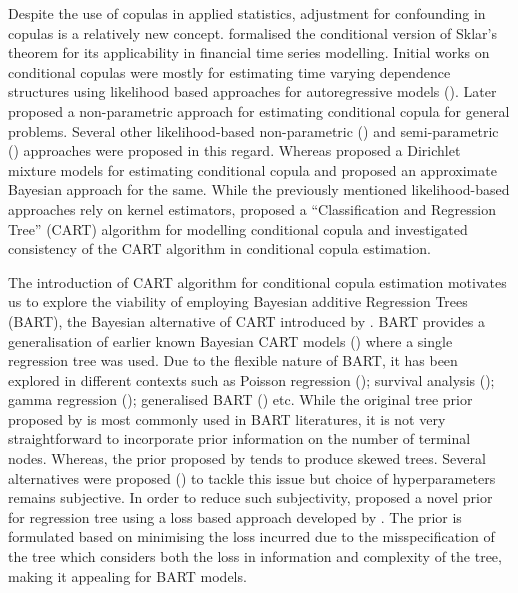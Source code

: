 \documentclass{amsart}
\begin{document}
Despite the use of copulas in applied statistics, adjustment for confounding in copulas is a relatively new concept. \citet{patton2006} formalised the conditional version of Sklar's theorem for its applicability in financial time series modelling. Initial works on conditional copulas were mostly for estimating time varying dependence structures using likelihood based approaches for autoregressive models (\citet{patton2006,JONDEAU2006827,BARTRAM20071461}). Later \citet{acar2010} proposed a non-parametric approach for estimating conditional copula for general problems. Several other likelihood-based non-parametric (\citet{GIJBELS20111919,Gijbels2012mult_cop}) and semi-parametric (\citet{ABEGAZ201243}) approaches were proposed in this regard. Whereas \citet{valle_cond_cop} proposed a Dirichlet mixture models for estimating conditional copula and \citet{GRAZIAN2022107417} proposed an approximate Bayesian approach for the same. While the previously mentioned likelihood-based approaches rely on kernel estimators, \citet{BonacinaLopezThomas+2025} proposed a ``Classification and Regression Tree'' (CART) \cite{brei_CART} algorithm for modelling conditional copula and investigated consistency of the CART algorithm in conditional copula estimation.

The introduction of CART algorithm for conditional copula estimation motivates us to explore the viability of employing Bayesian additive Regression Trees (BART), the Bayesian alternative of CART introduced by \citet{chipman2010BART}. BART provides a generalisation of earlier known Bayesian CART models (\citet{chipman98BCART,denison98BCART}) where a single regression tree was used. Due to the flexible nature of BART, it has been explored in different contexts such as Poisson regression (\citet{Murray03042021}); survival analysis (\citet{Sparapani_BART}); gamma regression (\citet{Linero_BART_gamma}); generalised BART (\citet{Linero02012025}) etc. While the original tree prior proposed by \citet{chipman98BCART} is most commonly used in BART literatures, it is not very straightforward to incorporate prior information on the number of terminal nodes. Whereas, the prior proposed by \citet{denison98BCART} tends to produce skewed trees. Several alternatives were proposed (\citet{Wu_CART,rockova_BART,Linero_BART_VS}) to tackle this issue but choice of hyperparameters remains subjective. In order to reduce such subjectivity, \citet{serafini2024lossbasedpriortreetopologies} proposed a novel prior for regression tree using a loss based approach developed by \citet{villa_loss-prior}. The prior is formulated based on minimising the loss incurred due to the misspecification of the tree which considers both the loss in information and complexity of the tree, making it appealing for BART models.
\end{document}
